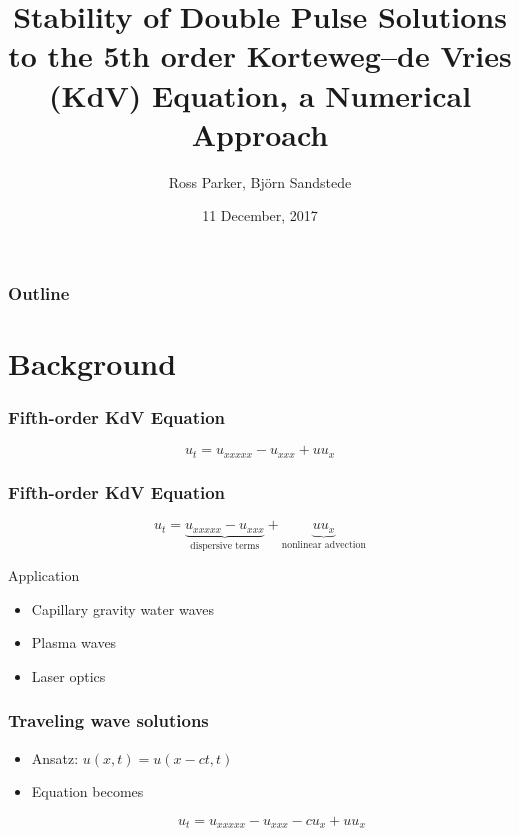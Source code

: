 \documentclass[16pt]{beamer}
\title[Stability of Double Pulses]{Stability of Double Pulse Solutions to the 5th order Korteweg–de Vries (KdV) Equation, a Numerical Approach}
\author[R. Parker]{Ross Parker, Bj\"{o}rn Sandstede}
\institute{Brown University}
\date{11 December, 2017}
\begin{document}
 
\frame{\titlepage}
 
\begin{frame}
\frametitle{Outline}
\tableofcontents
\end{frame}

\section{Background}

\begin{frame}
	\frametitle{Fifth-order KdV Equation }   
	\fontsize{18}{7.2}\selectfont
	\begin{center}
		\[ u_t = u_{xxxxx} - u_{xxx} + u u_x \]
	\end{center}
\end{frame}

\begin{frame}
	\frametitle{Fifth-order KdV Equation}
	\fontsize{18}{7.2}\selectfont
	\begin{description}
		\item<1->
			\begin{center}
			\[ u_t = \underbrace{u_{xxxxx} - u_{xxx}}_{\text{dispersive terms}} + \underbrace{u u_x}_{\text{nonlinear advection}} \]
			\end{center}
		\vspace{0.5cm}
		\item<2->

		Application
		\begin{itemize}
			\item Capillary gravity water waves
			\item Plasma waves
			\item Laser optics
		\end{itemize}
	\end{description}
\end{frame}

\begin{frame}
	\frametitle{Traveling wave solutions}
	\fontsize{18}{7.2}\selectfont
	\begin{itemize}
		\item<1-> Ansatz: $u(x, t) = u(x - ct, t) $

		\vspace{0.5cm}
		\item<2-> Equation becomes
		\begin{center}
		\[ u_t = u_{xxxxx} - u_{xxx} - c u_x + u u_x \]
		\end{center}
	\end{itemize}
\end{frame}
\end{document}
